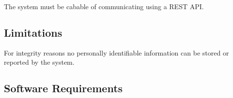 The system must be cabable of communicating using a REST API.

\subsection{Limitations}
For integrity reasons no personally identifiable information can be stored or reported by the system.

\subsection{Software Requirements}
\label{sec:software_req}
\reqtable
{	
}
